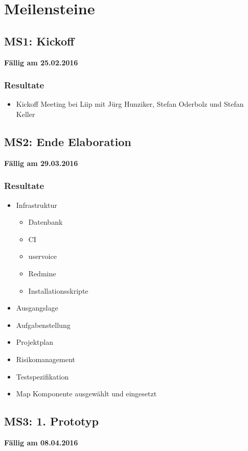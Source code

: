 \section{Meilensteine}
\subsection{MS1: Kickoff}
\label{pm-ms1}
\textbf{Fällig am 25.02.2016}
\subsubsection{Resultate}
\begin{itemize}
	\item Kickoff Meeting bei Liip mit Jürg Hunziker, Stefan Oderbolz und Stefan Keller
\end{itemize}

\subsection{MS2: Ende Elaboration}
\label{pm-ms2}
\textbf{Fällig am 29.03.2016}
\subsubsection{Resultate}
\begin{itemize}
	\item Infrastruktur
	\begin{itemize}
		\item Datenbank
		\item CI
		\item uservoice
		\item Redmine
		\item Installationsskripte
	\end{itemize}
	\item Ausgangslage
	\item Aufgabenstellung
	\item Projektplan
	\item Risikomanagement
	\item Testspezifikation
	\item Map Komponente ausgewählt und eingesetzt
\end{itemize}

\subsection{MS3: 1. Prototyp}
\label{pm-ms3}
\textbf{Fällig am 08.04.2016}

